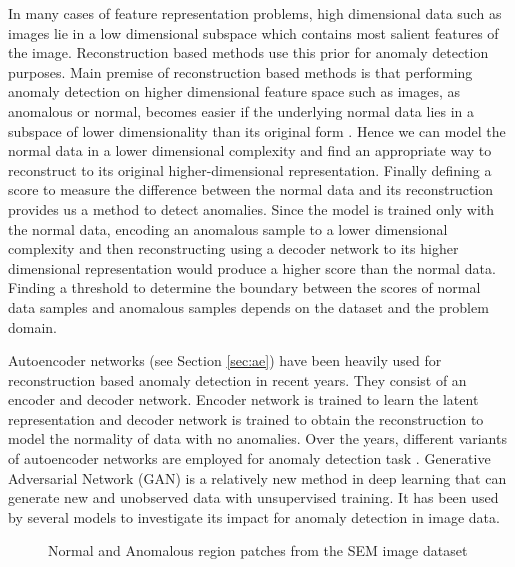 In many cases of feature representation problems, high dimensional data such as images lie
in a low dimensional subspace which contains most salient features of the image. Reconstruction 
based methods use this prior for anomaly detection purposes.
Main premise of reconstruction based methods is that performing anomaly detection on higher 
dimensional feature space such as images, as anomalous or normal, becomes easier if the underlying 
normal data lies in a subspace of lower dimensionality than its original form 
\cite{Beyer:1999:NNM:645503.656271}. Hence we can model the normal data in a lower dimensional 
complexity and find an appropriate way to reconstruct to its original higher-dimensional 
representation. Finally defining a score to measure the difference between the normal data and its reconstruction 
provides us a method to detect anomalies. Since the model is trained only with the normal data, 
encoding an anomalous sample to a lower dimensional complexity and then reconstructing using a decoder 
network to its higher dimensional representation would produce a higher score 
than the normal data. Finding a threshold to determine the boundary between the scores 
of normal data samples and anomalous samples depends on the dataset and 
the problem domain.

Autoencoder networks (see Section \ref{sec:ae}) have been heavily used for reconstruction based anomaly 
detection in recent years. They consist of an encoder and decoder network. Encoder 
network is trained to learn the latent representation and decoder network is trained to obtain 
the reconstruction to model the normality of data with no anomalies. Over the years, different 
variants of autoencoder networks are employed for anomaly detection task
\cite{kingma2013autoencoding, Masci2011StackedCA, an2015variational, leveau2017adversarial, Pidhorskyi:2018:GPN:3327757.3327787}. Generative Adversarial Network (GAN) is a relatively new method 
in deep learning that can generate new and unobserved data with unsupervised training. 
It has been used by several models \cite{Donahue2017AdversarialFL,Dumoulin2017AdversariallyLI,DBLP:journals/corr/abs-1812-02288,Akay2018GANomalySA,Akay2019SkipGANomalySC} to investigate its impact for anomaly detection in image data.

\begin{figure}[h!] 
	\hspace*{\fill} 
	\caption{Normal and Anomalous region patches from the SEM image dataset}
	\label{fig:data_samples_intro}
\end{figure}

